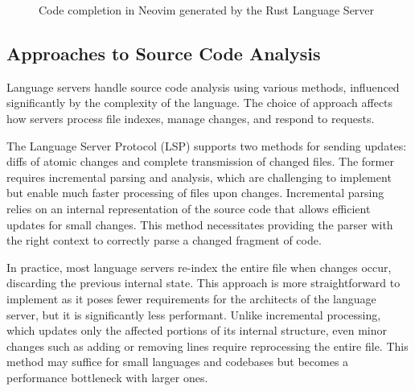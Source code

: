 \begin{figure}[h]
    \centering
    \caption{Code completion in Neovim generated by the Rust Language Server}
    \label{fig:completion}
\end{figure}

\subsection{Approaches to Source Code Analysis}\label{subsec:background:ApproachesToSourceCodeAnalysis}
Language servers handle source code analysis using various methods, influenced significantly by the complexity of the language. The choice of approach affects how servers process file indexes, manage changes, and respond to requests.

The Language Server Protocol (LSP) supports two methods for sending updates: diffs of atomic changes and complete transmission of changed files. The former requires incremental parsing and analysis, which are challenging to implement but enable much faster processing of files upon changes. Incremental parsing relies on an internal representation of the source code that allows efficient updates for small changes. This method necessitates providing the parser with the right context to correctly parse a changed fragment of code.

In practice, most language servers re-index the entire file when changes occur, discarding the previous internal state. This approach is more straightforward to implement as it poses fewer requirements for the architects of the language server, but it is significantly less performant. Unlike incremental processing, which updates only the affected portions of its internal structure, even minor changes such as adding or removing lines require reprocessing the entire file. This method may suffice for small languages and codebases but becomes a performance bottleneck with larger ones.

